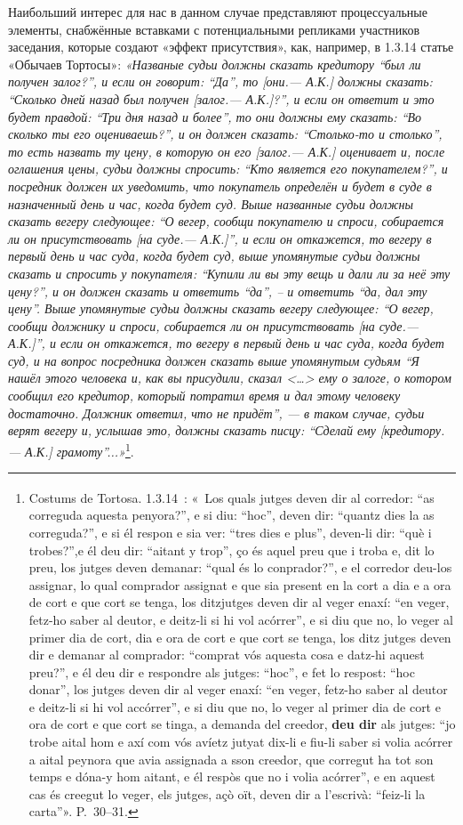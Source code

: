 Наибольший интерес для нас в данном случае представляют процессуальные элементы, снабжённые вставками с потенциальными репликами участников заседания, которые создают «эффект присутствия», как, например, в 1.3.14 статье «Обычаев Тортосы»: \emph{«Названые судьи должны сказать кредитору “был ли получен залог?”, и если он говорит: “Да”, то [они.--- А.К.] должны сказать: }\emph{“Сколько дней назад был получен [залог.--- А.К.]?”, и если он ответит и это будет правдой: “Три дня назад и более”, то они должны ему сказать: “Во сколько ты его оцениваешь?”, и он должен сказать: “Столько-то и столько”, то есть назвать ту цену, в которую он его [залог.--- А.К.] оценивает и, после оглашения цены, судьи должны спросить: “Кто является его покупателем?”, и посредник должен их уведомить, что покупатель определён и будет в суде в назначенный день и час, когда будет суд. Выше названные судьи должны сказать вегеру следующее: “О вегер, сообщи покупателю и спроси, собирается ли он присутствовать [на суде.--- А.К.]”, и если он откажется, то вегеру в первый день и час суда, когда будет суд, выше упомянутые судьи должны сказать и спросить у покупателя: “Купили ли вы эту вещь и дали ли за неё эту цену?”, и он должен сказать и ответить “да”, -- и ответить “да, дал эту цену”. Выше упомянутые судьи должны сказать вегеру следующее: “О вегер, сообщи должнику и спроси, собирается ли он присутствовать [на суде.--- А.К.]”, и если он откажется, то вегеру в первый день и час суда, когда будет суд, и на вопрос посредника должен сказать выше упомянутым судьям “Я нашёл этого человека и, как вы присудили, сказал <…> ему о залоге, о котором сообщил его кредитор, который потратил время и дал этому человеку достаточно. Должник ответил, что не придёт”, --- в таком случае, судьи верят вегеру и, услышав это, должны сказать писцу: “Сделай ему [кредитору. ---}\emph{ }\emph{А.К.] грамоту”...»}\footnote{\textsuperscript{ }Costums de Tortosa. 1.3.14~: «~Los quals jutges deven dir al corredor: “as correguda aquesta penyora?”, e si diu: “hoc”, deven dir: “quantz dies la as correguda?”, e si él respon e sia ver: “tres dies e plus”, deven-li dir: “què i trobes?”,e él deu dir: “aitant y trop”, ço és aquel preu que i troba e, dit lo preu, los jutges deven demanar: “qual és lo conprador?”, e el corredor deu-los assignar, lo qual comprador assignat e que sia present en la cort a dia e a ora de cort e que cort se tenga, los ditzjutges deven dir al veger enaxí: “en veger, fetz-ho saber al deutor, e deitz-li si hi vol acórrer”, e si diu que no, lo veger al primer dia de cort, dia e ora de cort e que cort se tenga, los ditz jutges deven dir e demanar al comprador: “comprat vós aquesta cosa e datz-hi aquest preu?”, e él deu dir e respondre als jutges: “hoc”, e fet lo respost: “hoc donar”, los jutges deven dir al veger enaxí: “en veger, fetz-ho saber al deutor e deitz-li si hi vol accórrer”, e si diu que no, lo veger al primer dia de cort e ora de cort e que cort se tinga, a demanda del creedor, \textbf{deu dir} als jutges: “jo trobe aital hom e axí com vós avíetz jutyat dix-li e fiu-li saber si volia acórrer a aital peynora que avia assignada a sson creedor, que corregut ha tot son temps e dóna-y hom aitant, e él respòs que no i volia acórrer”, e en aquest cas és creegut lo veger, els jutges, açò oït, deven dir a l'escrivà: “feiz-li la carta”». P.~30--31.}.

